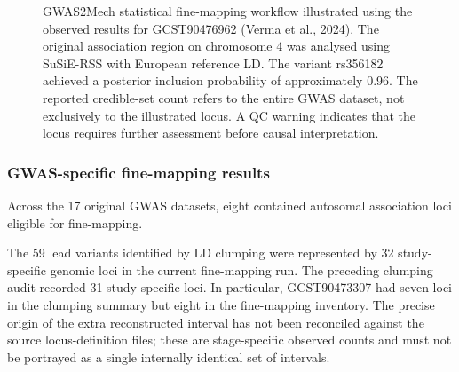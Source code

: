 \documentclass[11pt,a4paper]{article}
\begin{document}
\begin{figure}[htbp]

\caption{
GWAS2Mech statistical fine-mapping workflow illustrated
using the observed results for GCST90476962
(Verma et al., 2024).
The original association region on chromosome 4
was analysed using SuSiE-RSS with European reference LD.
The variant rs356182 achieved a posterior inclusion
probability of approximately 0.96.
The reported credible-set count refers to the entire
GWAS dataset, not exclusively to the illustrated locus.
A QC warning indicates that the locus requires further
assessment before causal interpretation.
}

\label{fig:finemapping_workflow}
\end{figure}


\subsubsection{GWAS-specific fine-mapping results}

Across the 17 original GWAS datasets, eight contained
autosomal association loci eligible for fine-mapping.

The 59 lead variants identified by LD clumping were
represented by 32 study-specific genomic loci in
the current fine-mapping run. The preceding clumping
audit recorded 31 study-specific loci. In particular,
GCST90473307 had seven loci in the clumping summary
but eight in the fine-mapping inventory. The precise
origin of the extra reconstructed interval has not
been reconciled against the source locus-definition
files; these are stage-specific observed counts and
must not be portrayed as a single internally identical
set of intervals.
\end{document}
